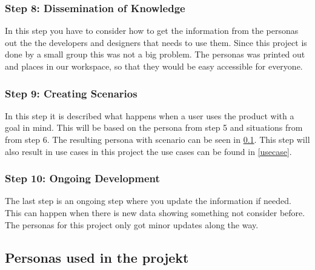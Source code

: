 \subsubsection{Step 8: Dissemination of Knowledge}
In this step you have to consider how to get the information from the personas out the the developers and designers that needs to use them. Since this project is done by a small group this was not a big problem. The personas was printed out and places in our workspace, so that they would be easy accessible for everyone.

\subsubsection{Step 9: Creating Scenarios}
In this step it is described what happens when a user uses the product with a goal in mind. This will be based on the persona from step 5 and situations from from step 6. The resulting persona with scenario can be seen in \cref{akkpersona}. This step will also result in use cases in this project the use cases can be found in \cref{usecase}.

\subsubsection{Step 10: Ongoing Development}
The last step is an ongoing step where you update the information if needed. This can happen when there is new data showing something not consider before. The personas for this project only got minor updates along the way.

\subsection{Personas used in the projekt}\label{akkpersona}

